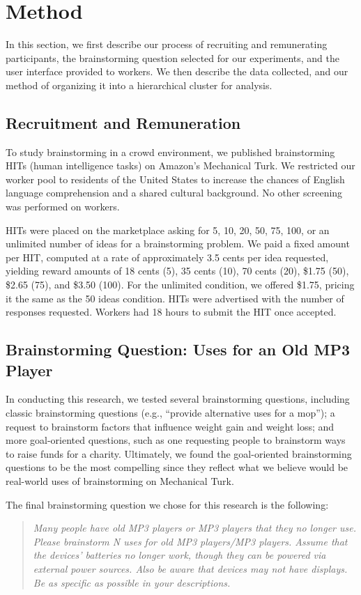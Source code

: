 \section{Method}
In this section, we first describe our process of recruiting and remunerating participants, the brainstorming question selected for our experiments, and the user interface provided to workers. We then describe the data collected, and our method of organizing it into a hierarchical cluster for analysis.

\subsection{Recruitment and Remuneration}
To study brainstorming in a crowd environment, we published brainstorming HITs (human intelligence tasks) on Amazon's Mechanical Turk. We restricted our worker pool to residents of the United States to increase the chances of English language comprehension and a shared cultural background. No other screening was performed on workers.

HITs were placed on the marketplace asking for 5, 10, 20, 50, 75, 100, or an unlimited number of ideas for a brainstorming problem. We paid a fixed amount per HIT, computed at a rate of approximately 3.5 cents per idea requested, yielding reward amounts of 18 cents (5), 35 cents (10), 70 cents (20), \$1.75 (50), \$2.65 (75), and \$3.50 (100). For the unlimited condition, we offered \$1.75, pricing it the same as the 50 ideas condition. HITs were advertised with the number of responses requested. Workers had 18 hours to submit the HIT once accepted.

\subsection{Brainstorming Question: Uses for an Old MP3 Player}
In conducting this research, we tested several brainstorming questions, including classic brainstorming questions (e.g., ``provide alternative uses for a mop''); a request to brainstorm factors that influence weight gain and weight loss; and more goal-oriented questions, such as one requesting people to brainstorm ways to raise funds for a charity. Ultimately, we found the goal-oriented brainstorming questions to be the most compelling since they reflect what we believe would be real-world uses of brainstorming on Mechanical Turk.

The final brainstorming question we chose for this research is the following:
\begin{quote}
{\em Many people have old MP3 players or MP3 players that they no longer use. Please brainstorm N uses for old MP3 players/MP3 players. Assume that the devices' batteries no longer work, though they can be powered via external power sources. Also be aware that devices may {\em not \/} have displays. Be as specific as possible in your descriptions.\/}
\end{quote}


